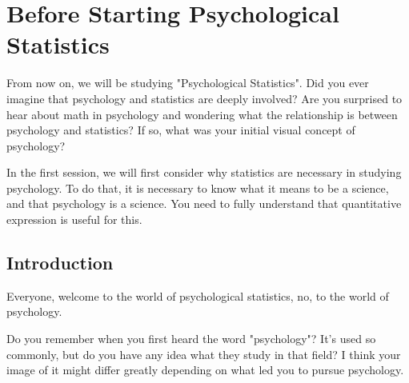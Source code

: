 \documentclass{ltjsbook}
\begin{document}
\chapter{Before Starting Psychological Statistics}
\label{m01_introduction}
From now on, we will be studying "Psychological Statistics". Did you ever imagine that psychology and statistics are deeply involved? Are you surprised to hear about math in psychology and wondering what the relationship is between psychology and statistics? If so, what was your initial visual concept of psychology?

In the first session, we will first consider why statistics are necessary in studying psychology. To do that, it is necessary to know what it means to be a science, and that psychology is a science. You need to fully understand that quantitative expression is useful for this.

\section{Introduction}

Everyone, welcome to the world of psychological statistics, no, to the world of psychology.

Do you remember when you first heard the word "psychology"? It's used so commonly, but do you have any idea what they study in that field? I think your image of it might differ greatly depending on what led you to pursue psychology.
\end{document}

